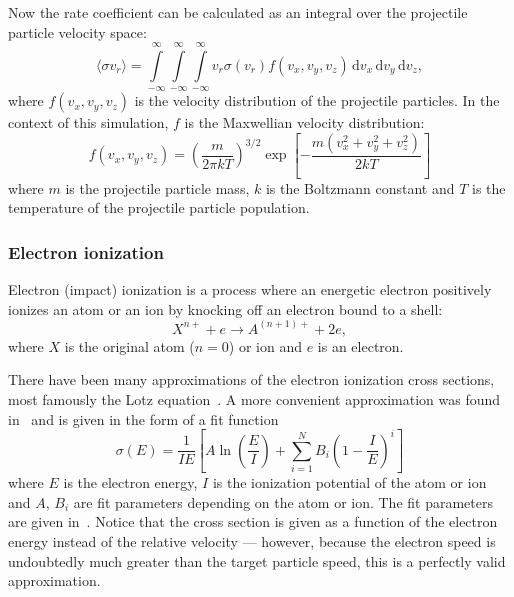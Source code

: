 \documentclass[a4paper,twoside,12pt]{article}
\begin{document}
Now the rate coefficient can be calculated as an integral over the projectile particle velocity space:
\begin{equation}
    \label{eq:ratecoeff}
    \langle \sigma v_r \rangle = \int\limits_{-\infty}^\infty \int\limits_{-\infty}^\infty \int\limits_{-\infty}^\infty v_r \sigma(v_r) f(v_x, v_y, v_z)\,\mathrm{d}v_x\,\mathrm{d}v_y\,\mathrm{d}v_z,
\end{equation}
where $f(v_x, v_y, v_z)$ is the velocity distribution of the projectile particles. In the context of this simulation, $f$ is the Maxwellian velocity distribution:
\begin{equation}
    f(v_x, v_y, v_z) = \left(\frac{m}{2\pi kT}\right)^{3/2} \exp \left[ -\frac{m(v_x^2 + v_y^2 + v_z^2)}{2kT} \right]
\end{equation}
where $m$ is the projectile particle mass, $k$ is the Boltzmann constant and $T$ is the temperature of the projectile particle population.

\subsubsection{Electron ionization}
Electron (impact) ionization is a process where an energetic electron positively ionizes an atom or an ion by knocking off an electron bound to a shell:
\[
    X^{n+} + e \rightarrow A^{(n+1)+} + 2e,
\]
where $X$ is the original atom ($n=0$) or ion and $e$ is an electron.

There have been many approximations of the electron ionization cross sections, most famously the Lotz equation~\cite{lotz}. A more convenient approximation was found in~\cite{recommended_ionization} and is given in the form of a fit function
\begin{equation}
    \label{eq:ionization_fit}
    \sigma(E) = \frac{1}{IE} \left[ A \ln \left(\frac{E}{I}\right) + \sum\limits_{i=1}^N
    B_i \left(1-\frac{I}{E}\right)^i \right]
\end{equation}
where $E$ is the electron energy, $I$ is the ionization potential of the atom or ion and $A$, $B_i$ are fit parameters depending on the atom or ion. The fit parameters are given in~\cite{recommended_ionization}. Notice that the cross section is given as a function of the electron energy instead of the relative velocity --- however, because the electron speed is undoubtedly much greater than the target particle speed, this is a perfectly valid approximation.
\end{document}
